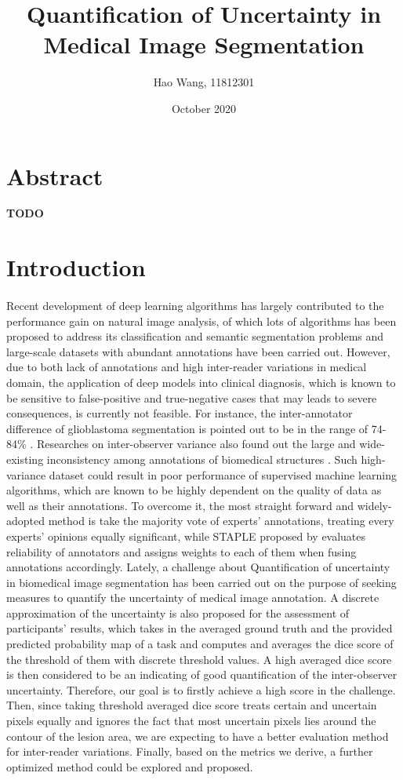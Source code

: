 \documentclass[12pt]{extarticle}
\title{Quantification of Uncertainty in Medical Image Segmentation}
\author{Hao Wang, 11812301}
\date{October 2020}
\begin{document}
\maketitle
\section*{Abstract}
\textbf{TODO}
\section{Introduction}
\paragraph{}
Recent development of deep learning algorithms has largely contributed to
the performance gain on natural image analysis, of which lots
of algorithms has been proposed to address its classification and semantic
segmentation problems and large-scale datasets with abundant annotations have been
carried out\cite{nair_precup_arnold_arbel_2020}.
However, due to
both lack of annotations and high inter-reader variations\cite{zhang2020disentangling}
in medical domain, the application of deep models into clinical diagnosis,
which is known to be sensitive to false-positive and true-negative cases that may leads
to severe consequences, is currently not feasible. 
For instance, the inter-annotator difference of glioblastoma segmentation
is pointed out to be in the range of 74-84\% \cite{6975210}.
Researches on inter-observer variance also found out
the large and wide-existing inconsistency among annotations of biomedical structures
\cite{Variability2019}\cite{interobserver2018}. Such high-variance dataset 
could result in poor performance of supervised machine learning algorithms,
which are known to be highly dependent on the quality of data as well as their annotations.
To overcome it, the most straight forward and widely-adopted method 
is take the majority vote of experts' annotations, treating every 
experts' opinions equally significant\cite{6975210}, while STAPLE proposed by \cite{STAPLE} 
evaluates reliability of annotators and assigns weights to each of them when 
fusing annotations accordingly.
Lately, a challenge about Quantification of uncertainty 
in biomedical image segmentation has been carried
out on the purpose of seeking measures to quantify the uncertainty of 
medical image annotation. A discrete approximation of the uncertainty is also
proposed for the assessment of participants' results, which
takes in the averaged ground truth and the provided predicted probability map of a task
and computes and averages the dice score of the threshold of them with
discrete threshold values\cite{qubiq}. A high averaged dice score is then considered to 
be an indicating of good quantification of the inter-observer uncertainty.
Therefore, our goal is to firstly achieve a high score in the challenge. 
Then, since taking threshold averaged dice score treats certain and uncertain pixels equally 
and ignores the fact that most uncertain pixels lies around 
the contour of the lesion area, we are expecting to have a
better evaluation method for inter-reader variations. 
Finally, based on the metrics we derive, a further
optimized method could be explored and proposed.
\end{document}
